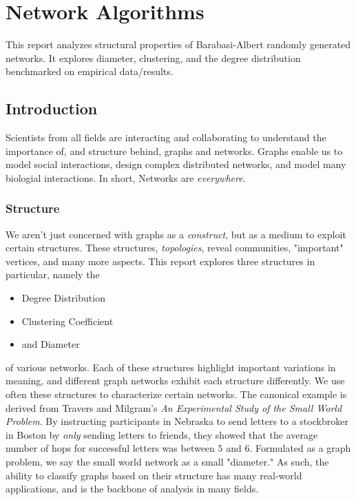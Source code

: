 \section{Network Algorithms}
	This report analyzes structural properties of Barabasi-Albert randomly generated
    networks. It explores diameter, clustering, and the degree distribution 
    benchmarked on empirical data/results.

\subsection{Introduction}
Scientists from all fields are interacting and collaborating to understand the 
importance of, and structure behind, graphs and networks. Graphs enable us to model 
social interactions, design complex distributed networks, and model many biologial 
interactions. In short, Networks are \textit{everywhere}. 

\subsubsection{Structure}
We aren't just concerned with graphs as a \textit{construct}, but as a medium to 
exploit certain structures. These structures, \textit{topologies}, reveal 
communities, "important" vertices, and many more aspects. This report
explores three structures in particular, namely the
\begin{itemize}[$\diamond$]
	\item Degree Distribution
	\item Clustering Coefficient
	\item and Diameter
\end{itemize}
of various networks. Each of these structures highlight important variations in
meaning, and different graph networks exhibit each structure differently. 
We use often these structures to characterize certain networks. The canonical example
is derived from Travers and Milgram's \textit{An Experimental Study of the Small 
World Problem}. By instructing participants in Nebraska to send letters to a 
stockbroker in Boston by \textit{only} sending letters to friends, they showed 
that the average number of hops for successful letters was between $5$ and $6$. 
Formulated as a graph problem, we say the small world network as a small "diameter."
As such, the ability to classify graphs based on their structure has many real-world
applications, and is the backbone of analysis in many fields.  

